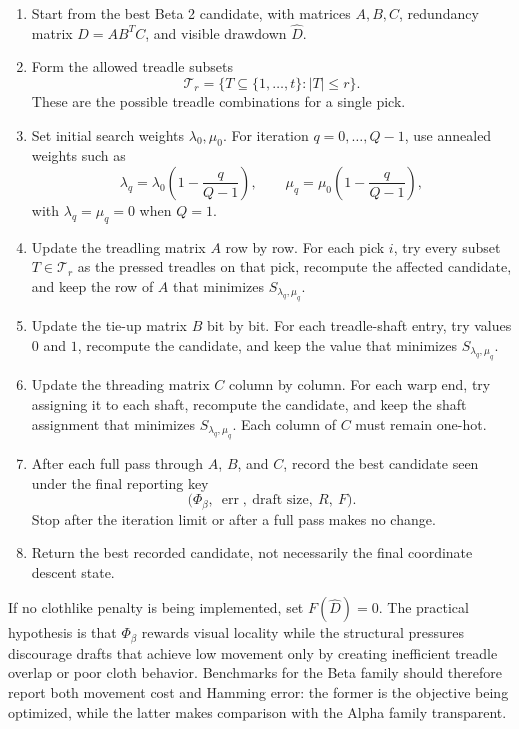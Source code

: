 \documentclass[11pt]{article}
\begin{document}
\begin{enumerate}[label=\textbf{B3.\arabic*.}]
  \item Start from the best Beta 2 candidate, with matrices \(A,B,C\), redundancy
  matrix \(D=AB^TC\), and visible drawdown \(\widehat{D}\).

  \item Form the allowed treadle subsets
  \[
    \mathcal{T}_r=\{T\subseteq\{1,\dots,t\}: |T|\le r\}.
  \]
  These are the possible treadle combinations for a single pick.

  \item Set initial search weights \(\lambda_0,\mu_0\). For iteration
  \(q=0,\dots,Q-1\), use annealed weights such as
  \[
    \lambda_q=\lambda_0\left(1-\frac{q}{Q-1}\right),
    \qquad
    \mu_q=\mu_0\left(1-\frac{q}{Q-1}\right),
  \]
  with \(\lambda_q=\mu_q=0\) when \(Q=1\).

  \item Update the treadling matrix \(A\) row by row. For each pick \(i\), try
  every subset \(T\in\mathcal{T}_r\) as the pressed treadles on that pick,
  recompute the affected candidate, and keep the row of \(A\) that minimizes
  \(S_{\lambda_q,\mu_q}\).

  \item Update the tie-up matrix \(B\) bit by bit. For each treadle-shaft entry,
  try values \(0\) and \(1\), recompute the candidate, and keep the value that
  minimizes \(S_{\lambda_q,\mu_q}\).

  \item Update the threading matrix \(C\) column by column. For each warp end,
  try assigning it to each shaft, recompute the candidate, and keep the shaft
  assignment that minimizes \(S_{\lambda_q,\mu_q}\). Each column of \(C\) must
  remain one-hot.

  \item After each full pass through \(A\), \(B\), and \(C\), record the best
  candidate seen under the final reporting key
  \[
    \bigl(\Phi_\beta,\ \operatorname{err},\ \text{draft size},\ R,\ F\bigr).
  \]
  Stop after the iteration limit or after a full pass makes no change.

  \item Return the best recorded candidate, not necessarily the final coordinate
  descent state.
\end{enumerate}

If no clothlike penalty is being implemented, set \(F(\widehat{D})=0\). The
practical hypothesis is that \(\Phi_\beta\) rewards visual locality while the
structural pressures discourage drafts that achieve low movement only by
creating inefficient treadle overlap or poor cloth behavior. Benchmarks for the
Beta family should therefore report both movement cost and Hamming error: the
former is the objective being optimized, while the latter makes comparison with
the Alpha family transparent.
\end{document}
